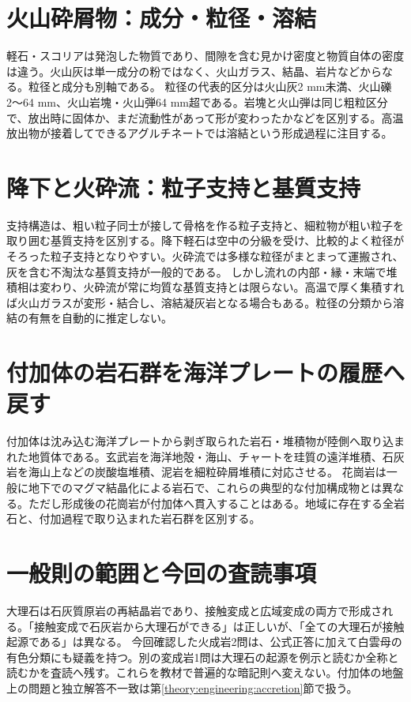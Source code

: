 \section{火山砕屑物：成分・粒径・溶結}
\label{theory:petrology:pyroclast}
軽石・スコリアは発泡した物質であり、間隙を含む見かけ密度と物質自体の密度は違う。火山灰は単一成分の粉ではなく、火山ガラス、結晶、岩片などからなる\cite{usgs_ash_density}。粒径と成分も別軸である。
粒径の代表的区分は火山灰2 mm未満、火山礫2〜64 mm、火山岩塊・火山弾64 mm超である\cite{usgs_tephra_sizes}。岩塊と火山弾は同じ粗粒区分で、放出時に固体か、まだ流動性があって形が変わったかなどを区別する。高温放出物が接着してできるアグルチネートでは溶結という形成過程に注目する\cite{gsj_fuji_units}。

\section{降下と火砕流：粒子支持と基質支持}
\label{theory:petrology:deposition}
支持構造は、粗い粒子同士が接して骨格を作る粒子支持と、細粒物が粗い粒子を取り囲む基質支持を区別する。降下軽石は空中の分級を受け、比較的よく粒径がそろった粒子支持となりやすい。火砕流では多様な粒径がまとまって運搬され、灰を含む不淘汰な基質支持が一般的である\cite{usgs_pinatubo1996,usgs_tephra_fall}。
しかし流れの内部・縁・末端で堆積相は変わり、火砕流が常に均質な基質支持とは限らない。高温で厚く集積すれば火山ガラスが変形・結合し、溶結凝灰岩となる場合もある\cite{usgs_bishop_tuff}。粒径の分類から溶結の有無を自動的に推定しない。

\section{付加体の岩石群を海洋プレートの履歴へ戻す}
\label{theory:petrology:accretion}
付加体は沈み込む海洋プレートから剥ぎ取られた岩石・堆積物が陸側へ取り込まれた地質体である。玄武岩を海洋地殻・海山、チャートを珪質の遠洋堆積、石灰岩を海山上などの炭酸塩堆積、泥岩を細粒砕屑堆積に対応させる\cite{aist_accretion2026,gsj_saganoseki1993}。
花崗岩は一般に地下でのマグマ結晶化による岩石で、これらの典型的な付加構成物とは異なる。ただし形成後の花崗岩が付加体へ貫入することはある。地域に存在する全岩石と、付加過程で取り込まれた岩石群を区別する。

\section{一般則の範囲と今回の査読事項}
\label{theory:petrology:exceptions}
大理石は石灰質原岩の再結晶岩であり、接触変成と広域変成の両方で形成される\cite{nelson_contact2011,nelson_regional2011}。「接触変成で石灰岩から大理石ができる」は正しいが、「全ての大理石が接触起源である」は異なる。
今回確認した火成岩2問は、公式正答に加えて白雲母の有色分類にも疑義を持つ。別の変成岩1問は大理石の起源を例示と読むか全称と読むかを査読へ残す。これらを教材で普遍的な暗記則へ変えない。付加体の地盤上の問題と独立解答不一致は第\ref{theory:engineering:accretion}節で扱う。

